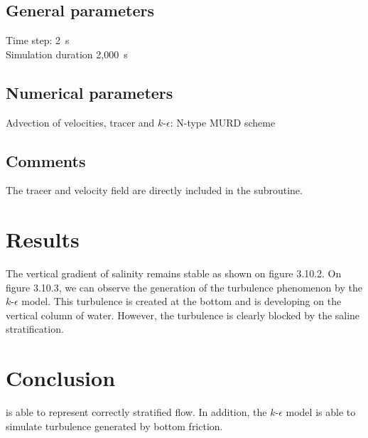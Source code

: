 \subsection{General parameters}
%
Time step: 2~s\\
Simulation duration 2,000~s
%
%
%
\subsection{Numerical parameters}
%
Advection of velocities, tracer and $k$-$\epsilon$: N-type MURD scheme
%
\subsection{Comments}
%
The tracer and velocity field are directly included in the
 subroutine.
%
%
%
\section{Results}
%
The vertical gradient of salinity remains stable as shown on figure
3.10.2.
On figure 3.10.3, we can observe the generation of the turbulence
phenomenon by the $k$-$\epsilon$ model.
This turbulence is created at the bottom and is developing on the
vertical column of water.
However, the turbulence is clearly blocked by the saline stratification.
%
\section{Conclusion}
%
 is able to represent correctly stratified flow.
In addition, the $k$-$\epsilon$ model is able to simulate turbulence
generated by bottom friction.
%
%
